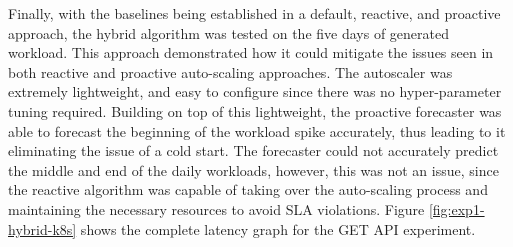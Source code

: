 \begin{center}
\begin{minipage}{\linewidth}
    \label{fig:exp1-hybrid-k8s}
\end{minipage}
\end{center}

Finally, with the baselines being established in a default, reactive, and proactive approach, the hybrid algorithm was tested on the five days of generated workload. This approach demonstrated how it could mitigate the issues seen in both reactive and proactive auto-scaling approaches. The autoscaler was extremely lightweight, and easy to configure since there was no hyper-parameter tuning required. Building on top of this lightweight, the proactive forecaster was able to forecast the beginning of the workload spike accurately, thus leading to it eliminating the issue of a cold start. The forecaster could not accurately predict the middle and end of the daily workloads, however, this was not an issue, since the reactive algorithm was capable of taking over the auto-scaling process and maintaining the necessary resources to avoid SLA violations. Figure \ref{fig:exp1-hybrid-k8s} shows the complete latency graph for the GET API experiment.\par

